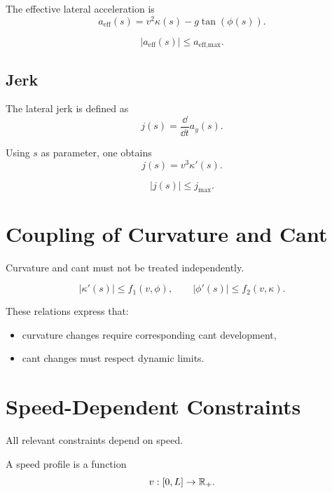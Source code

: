 \begin{definition}
The effective lateral acceleration is
\[
a_{\text{eff}}(s) = v^2 \kappa(s) - g \tan(\phi(s)).
\]
\end{definition}

\begin{constraint}
\[
|a_{\text{eff}}(s)| \leq a_{\text{eff,max}}.
\]
\end{constraint}


\subsection{Jerk}

\begin{definition}[Jerk]
The lateral jerk is defined as
\[
j(s) = \frac{\dd}{\dd t} a_y(s).
\]
\end{definition}

Using $s$ as parameter, one obtains
\[
j(s) = v^3 \kappa'(s).
\]

\begin{constraint}
\[
|j(s)| \leq j_{\max}.
\]
\end{constraint}


\section{Coupling of Curvature and Cant}

Curvature and cant must not be treated independently.

\begin{constraint}
\[
|\kappa'(s)| \leq f_1(v,\phi),
\qquad
|\phi'(s)| \leq f_2(v,\kappa).
\]
\end{constraint}

These relations express that:
\begin{itemize}
\item curvature changes require corresponding cant development,
\item cant changes must respect dynamic limits.
\end{itemize}


\section{Speed-Dependent Constraints}

All relevant constraints depend on speed.

\begin{definition}
A speed profile is a function
\[
v : [0,L] \to \mathbb{R}_+.
\]
\end{definition}

